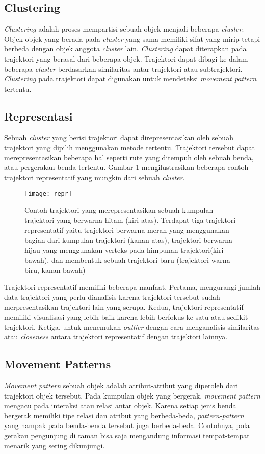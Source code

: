\subsection{Clustering}
\textit{Clustering} adalah proses mempartisi sebuah objek menjadi beberapa \textit{cluster}. Objek-objek yang berada pada \textit{cluster} yang sama memiliki sifat yang mirip tetapi berbeda dengan objek anggota \textit{cluster} lain. \textit{Clustering} dapat diterapkan pada trajektori yang berasal dari beberapa objek. Trajektori dapat dibagi ke dalam beberapa \textit{cluster} berdasarkan similaritas antar trajektori atau subtrajektori. \textit{Clustering} pada trajektori dapat digunakan untuk mendeteksi \textit{movement pattern} tertentu.

\subsection{Representasi}
Sebuah \textit{cluster} yang berisi trajektori dapat direpresentasikan oleh sebuah trajektori yang dipilih menggunakan metode tertentu. Trajektori tersebut dapat merepresentasikan beberapa hal seperti rute yang ditempuh oleh sebuah benda, atau pergerakan benda tertentu. Gambar \ref{fig:repr} mengilustrasikan  beberapa contoh trajektori representatif yang mungkin dari sebuah \textit{cluster}.
\begin{figure}[h]
	\centering  
	\texttt{[image: repr]}  
	\caption{Contoh trajektori yang merepresentasikan sebuah kumpulan trajektori yang berwarna hitam (kiri atas). Terdapat tiga trajektori representatif yaitu trajektori berwarna merah yang menggunakan bagian dari kumpulan trajektori (kanan atas), trajektori berwarna hijau yang menggunakan verteks pada himpunan trajektori(kiri bawah), dan membentuk sebuah trajektori baru (trajektori warna biru, kanan bawah)} 
	\label{fig:repr} 
\end{figure}

\par Trajektori representatif memiliki beberapa manfaat. Pertama, mengurangi jumlah data trajektori yang perlu dianalisis karena trajektori tersebut sudah merpresentasikan trajektori lain yang serupa. Kedua, trajektori representatif memiliki visualisasi yang lebih baik karena lebih berfokus ke satu atau sedikit trajektori. Ketiga, untuk menemukan \textit{outlier} dengan cara menganalisis similaritas atau \textit{closeness} antara trajektori representatif dengan trajektori lainnya.

\subsection{Movement Patterns}
\textit{Movement pattern} sebuah objek adalah atribut-atribut yang diperoleh dari trajektori objek tersebut. Pada kumpulan objek yang bergerak, \textit{movement pattern} mengacu pada interaksi atau relasi antar objek. Karena setiap jenis benda bergerak memiliki tipe relasi dan atribut yang berbeda-beda, \textit{pattern-pattern} yang nampak pada benda-benda tersebut juga berbeda-beda. Contohnya, pola gerakan pengunjung di taman bisa saja mengandung informasi tempat-tempat menarik yang sering dikunjungi.

